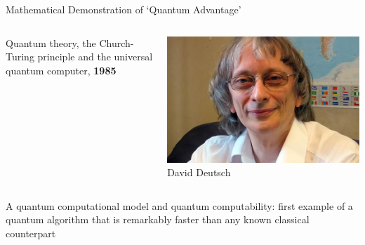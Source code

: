 \documentclass{beamer}
\begin{document}
\begin{frame}{Mathematical Demonstration of `Quantum Advantage'}

  \begin{minipage}[0.3\textheight]{\textwidth}
  \begin{columns}[c]
  \begin{column}{0.6\textwidth}
        Quantum theory, the Church-Turing principle and the universal quantum computer,
        \textbf{1985}
  \end{column}
  \begin{column}{0.44\textwidth}
    \includegraphics[scale=0.2]{images/deutsch.jpg}
    \tiny{David Deutsch}
  \end{column}
  \end{columns}
  \end{minipage}

  \vfill
  \begin{center}
  \scriptsize{
        A quantum computational model and quantum computability: first example of a quantum
        algorithm that is remarkably faster than any known classical counterpart
  }
  \end{center}
\end{frame}
\end{document}
